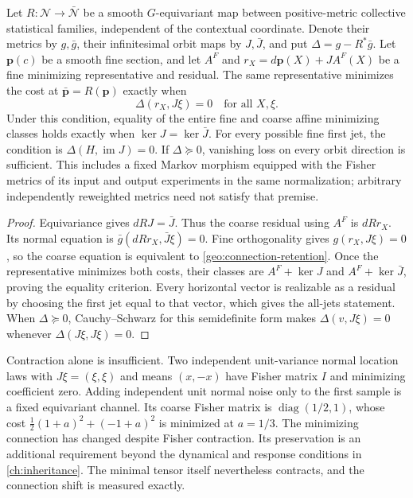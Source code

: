 Let $R:\mathcal N\to\bar{\mathcal N}$ be a smooth $G$-equivariant map between positive-metric collective statistical families, independent of the contextual coordinate. Denote their metrics by $g,\bar g$, their infinitesimal orbit maps by $J,\bar J$, and put $\Delta=g-R^*\bar g$. Let $\boldsymbol p(c)$ be a smooth fine section, and let $A^F$ and $r_X=d\boldsymbol p(X)+JA^F(X)$ be a fine minimizing representative and residual. The same representative minimizes the cost at $\bar{\boldsymbol p}=R(\boldsymbol p)$ exactly when
\begin{equation}
\Delta(r_X,J\xi)=0
\quad\text{for all }X,\xi.
\label{geo:connection-retention}
\end{equation}
Under this condition, equality of the entire fine and coarse affine minimizing classes holds exactly when $\ker J=\ker\bar J$. For every possible fine first jet, the condition is $\Delta(H,\operatorname{im}J)=0$. If $\Delta\succeq0$, vanishing loss on every orbit direction is sufficient. This includes a fixed Markov morphism equipped with the Fisher metrics of its input and output experiments in the same normalization; arbitrary independently reweighted metrics need not satisfy that premise.
\begin{proof}
Equivariance gives $dR J=\bar J$. Thus the coarse residual using $A^F$ is $dR r_X$. Its normal equation is $\bar g(dR r_X,\bar J\xi)=0$. Fine orthogonality gives $g(r_X,J\xi)=0$, so the coarse equation is equivalent to \cref{geo:connection-retention}. Once the representative minimizes both costs, their classes are $A^F+\ker J$ and $A^F+\ker\bar J$, proving the equality criterion. Every horizontal vector is realizable as a residual by choosing the first jet equal to that vector, which gives the all-jets statement. When $\Delta\succeq0$, Cauchy--Schwarz for this semidefinite form makes $\Delta(v,J\xi)=0$ whenever $\Delta(J\xi,J\xi)=0$.
\end{proof}

Contraction alone is insufficient. Two independent unit-variance normal location laws with $J\xi=(\xi,\xi)$ and means $(x,-x)$ have Fisher matrix $I$ and minimizing coefficient zero. Adding independent unit normal noise only to the first sample is a fixed equivariant channel. Its coarse Fisher matrix is $\operatorname{diag}(1/2,1)$, whose cost $\tfrac12(1+a)^2+(-1+a)^2$ is minimized at $a=1/3$. The minimizing connection has changed despite Fisher contraction. Its preservation is an additional requirement beyond the dynamical and response conditions in \cref{ch:inheritance}. The minimal tensor itself nevertheless contracts, and the connection shift is measured exactly.


